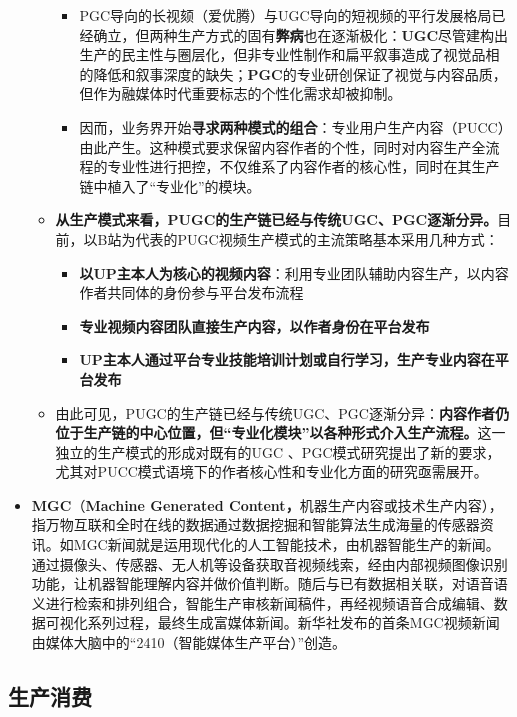 \documentclass[
  letterpaper,
  DIV=11,
  numbers=noendperiod]{scrreprt}
\begin{document}
\begin{itemize}
\begin{itemize}
    \begin{itemize}
    \item
      PGC导向的长视颏（爱优腾）与UGC导向的短视频的平行发展格局已经确立，但两种生产方式的固有\textbf{弊病}也在逐渐极化：\textbf{UGC}尽管建构出生产的民主性与圈层化，但非专业性制作和扁平叙事造成了视觉品相的降低和叙事深度的缺失；\textbf{PGC}的专业研创保证了视觉与内容品质，但作为融媒体时代重要标志的个性化需求却被抑制。
    \item
      因而，业务界开始\textbf{寻求两种模式的组合}：专业用户生产内容（PUCC）由此产生。这种模式要求保留内容作者的个性，同时对内容生产全流程的专业性进行把控，不仅维系了内容作者的核心性，同时在其生产链中植入了``专业化''的模块。
    \end{itemize}
  \item
    \textbf{从生产模式来看，PUGC的生产链已经与传统UGC、PGC逐渐分异。}目前，以B站为代表的PUGC视频生产模式的主流策略基本采用几种方式：

    \begin{itemize}
    \item
      \textbf{以UP主本人为核心的视频内容}：利用专业团队辅助内容生产，以内容作者共同体的身份参与平台发布流程
    \item
      \textbf{专业视频内容团队直接生产内容，以作者身份在平台发布}
    \item
      \textbf{UP主本人通过平台专业技能培训计划或自行学习，生产专业内容在平台发布}
    \end{itemize}
  \item
    由此可见，PUGC的生产链已经与传统UGC、PGC逐渐分异：\textbf{内容作者仍位于生产链的中心位置，但``专业化模块''以各种形式介入生产流程。}这一独立的生产模式的形成对既有的UGC
    、PGC模式研究提出了新的要求，尤其对PUCC模式语境下的作者核心性和专业化方面的研究亟需展开。
  \end{itemize}
\item
  \textbf{MGC}（\textbf{Machine Generated
  Content，}机器生产内容或技术生产内容），指万物互联和全时在线的数据通过数据挖掘和智能算法生成海量的传感器资讯。如MGC新闻就是运用现代化的人工智能技术，由机器智能生产的新闻。通过摄像头、传感器、无人机等设备获取音视频线索，经由内部视频图像识别功能，让机器智能理解内容并做价值判断。随后与已有数据相关联，对语音语义进行检索和排列组合，智能生产审核新闻稿件，再经视频语音合成编辑、数据可视化系列过程，最终生成富媒体新闻。新华社发布的首条MGC视频新闻由媒体大脑中的``2410（智能媒体生产平台）''创造。
\end{itemize}

\subsection{生产消费}\label{ux751fux4ea7ux6d88ux8d39}
\end{document}
